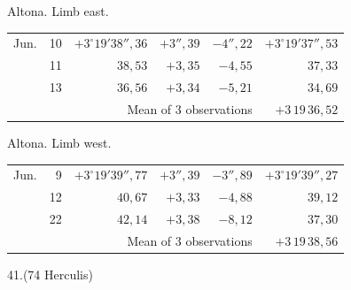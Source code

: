 \noindent\begin{minipage}[t]{.495\textwidth}\centering Altona. Limb east.\par\smallskip
{\scriptsize\setlength{\tabcolsep}{1pt}\renewcommand{\arraystretch}{1.2}\begin{tabular}{lr|r|r|r|r|}
Jun.&10&$+3^\circ19'38''{,}36$&$+3''{,}39$&$-4''{,}22$&$+3^\circ19'37''{,}53$\\
&11&$38{,}53$&$+3{,}35$&$-4{,}55$&$37{,}33$\\
&13&$36{,}56$&$+3{,}34$&$-5{,}21$&$34{,}69$\\
\cline{6-6}\multicolumn{5}{r}{Mean of 3 observations}&$+3\,19\,36{,}52$
\end{tabular}}\end{minipage}\hfill\begin{minipage}[t]{.495\textwidth}\centering Altona. Limb west.\par\smallskip
{\scriptsize\setlength{\tabcolsep}{1pt}\renewcommand{\arraystretch}{1.2}\begin{tabular}{lr|r|r|r|r}
Jun.&9&$+3^\circ19'39''{,}77$&$+3''{,}39$&$-3''{,}89$&$+3^\circ19'39''{,}27$\\
&12&$40{,}67$&$+3{,}33$&$-4{,}88$&$39{,}12$\\
&22&$42{,}14$&$+3{,}38$&$-8{,}12$&$37{,}30$\\
\cline{6-6}\multicolumn{5}{r}{Mean of 3 observations}&$+3\,19\,38{,}56$
\end{tabular}}\end{minipage}
\par\vspace{4mm}
\begin{center}41.\quad (74 Herculis)\end{center}

